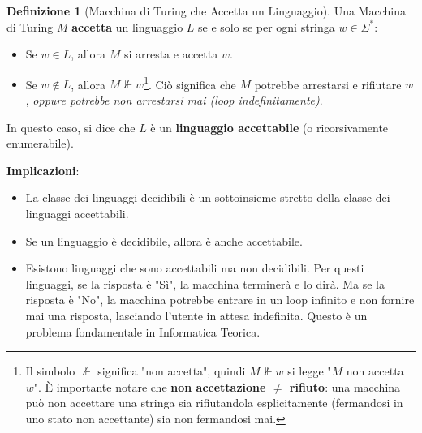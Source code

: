 \documentclass[a4paper]{article}
\theoremstyle{definition} %
\newtheorem{definition}{Definizione}
\begin{document}
\begin{definition}[Macchina di Turing che Accetta un Linguaggio]
    Una Macchina di Turing $M$ \textbf{accetta} un linguaggio $L$ se e solo se per ogni stringa $w \in \Sigma^*$:
    \begin{itemize}
        \item Se $w \in L$, allora $M$ si arresta e accetta $w$.
        \item Se $w \notin L$, allora $M \nVdash w$\footnote{Il simbolo $\nVdash$ significa "non accetta", quindi $M \nVdash w$ si legge "$M$ non accetta $w$". È importante notare che \textbf{non accettazione $\neq$ rifiuto}: una macchina può non accettare una stringa sia rifiutandola esplicitamente (fermandosi in uno stato non accettante) sia non fermandosi mai.}. Ciò significa che $M$ potrebbe arrestarsi e rifiutare $w$, \emph{oppure potrebbe non arrestarsi mai (loop indefinitamente)}.
    \end{itemize}
    In questo caso, si dice che $L$ è un \textbf{linguaggio accettabile} (o ricorsivamente enumerabile).
\end{definition}

\textbf{Implicazioni}:
\begin{itemize}
    \item La classe dei linguaggi decidibili è un sottoinsieme stretto della classe dei linguaggi accettabili.
    \item Se un linguaggio è decidibile, allora è anche accettabile.
    \item Esistono linguaggi che sono accettabili ma non decidibili. Per questi linguaggi, se la risposta è "Sì", la macchina terminerà e lo dirà. Ma se la risposta è "No", la macchina potrebbe entrare in un loop infinito e non fornire mai una risposta, lasciando l'utente in attesa indefinita. Questo è un problema fondamentale in Informatica Teorica.
\end{itemize}
\end{document}
